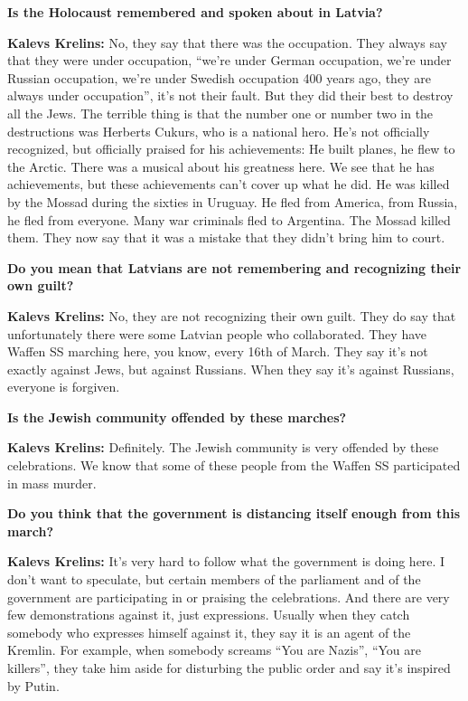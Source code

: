 \textbf{Is the Holocaust remembered and spoken about in Latvia?} 

\textbf{Kalevs Krelins:} No, they say that there was the occupation. They always say that they were under occupation, ``we’re under German occupation, we’re under Russian occupation, we’re under Swedish occupation 400 years ago, they are always under occupation'', it's not their fault. But they did their best to destroy all the Jews. The terrible thing is that the number one or number two in the destructions was Herberts Cukurs, who is a national hero. He's not officially recognized, but officially praised for his achievements: He built planes, he flew to the Arctic. There was a musical about his greatness here. We see that he has achievements, but these achievements can’t cover up what he did. He was killed by the Mossad during the sixties in Uruguay. He fled from America, from Russia, he fled from everyone. Many war criminals fled to Argentina. The Mossad killed them. They now say that it was a mistake that they didn't bring him to court. 

\textbf{Do you mean that Latvians are not remembering and recognizing their own guilt?} 

\textbf{Kalevs Krelins:} No, they are not recognizing their own guilt. They do say that unfortunately there were some Latvian people who collaborated. They have Waffen SS marching here, you know, every 16th of March. They say it's not exactly against Jews, but against Russians. When they say it's against Russians, everyone is forgiven. 

\textbf{Is the Jewish community offended by these marches?}   

\textbf{Kalevs Krelins:} Definitely. The Jewish community is very offended by these celebrations. We know that some of these people from the Waffen SS participated in mass murder.   

\textbf{Do you think that the government is distancing itself enough from this march?}  

\textbf{Kalevs Krelins:} It’s very hard to follow what the government is doing here. I don’t want to speculate, but certain members of the parliament and of the government are participating in or praising the celebrations. And there are very few demonstrations against it, just expressions. Usually when they catch somebody who expresses himself against it, they say it is an agent of the Kremlin.  For example, when somebody screams ``You are Nazis'', ``You are killers'', they take him aside for disturbing the public order and say it’s inspired by Putin.  

